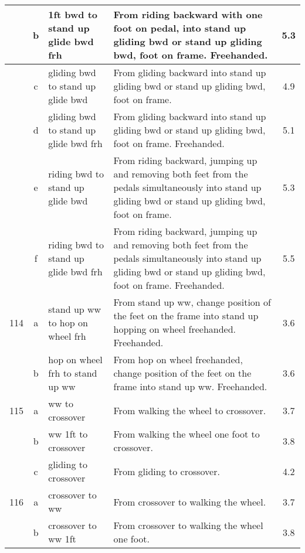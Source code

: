 \begin{longtable}{|r|c|p{4cm}|p{8cm}|c|}
\hline
  & b & 1ft bwd to stand up glide bwd frh & From riding backward with one foot on pedal, into stand up gliding bwd or stand up gliding bwd, foot on frame. Freehanded.  & 5.3 \\ 
\hline
  & c & gliding bwd to stand up glide bwd & From gliding backward into stand up gliding bwd or stand up gliding bwd, foot on frame. & 4.9 \\ 
\hline
  & d & gliding bwd to stand up glide bwd frh & From gliding backward into stand up gliding bwd or stand up gliding bwd, foot on frame. Freehanded. & 5.1 \\ 
\hline
  & e & riding bwd to stand up glide bwd  & From riding backward, jumping up and removing both feet from the pedals simultaneously into stand up gliding bwd or stand up gliding bwd, foot on frame.  & 5.3 \\ 
\hline
  & f & riding bwd to stand up glide bwd frh  & From riding backward, jumping up and removing both feet from the pedals simultaneously into stand up gliding bwd or stand up gliding bwd, foot on frame. Freehanded.  & 5.5 \\ 
\hline
114 & a & stand up ww to hop on wheel frh & From stand up ww, change position of the feet on the frame into stand up hopping on wheel freehanded. Freehanded. & 3.6 \\ 
\hline
  & b & hop on wheel frh to stand up ww & From hop on wheel freehanded, change position of the feet on the frame into stand up ww. Freehanded.  & 3.6 \\ 
\hline
115 & a & ww to crossover & From walking the wheel to crossover.  & 3.7 \\ 
\hline
  & b & ww 1ft to crossover & From walking the wheel one foot to crossover. & 3.8 \\ 
\hline
  & c & gliding to crossover  & From gliding to crossover.  & 4.2 \\ 
\hline
116 & a & crossover to ww & From crossover to walking the wheel.  & 3.7 \\ 
\hline
  & b & crossover to ww 1ft & From crossover to walking the wheel one foot. & 3.8 \\ 
\hline
\end{longtable}

